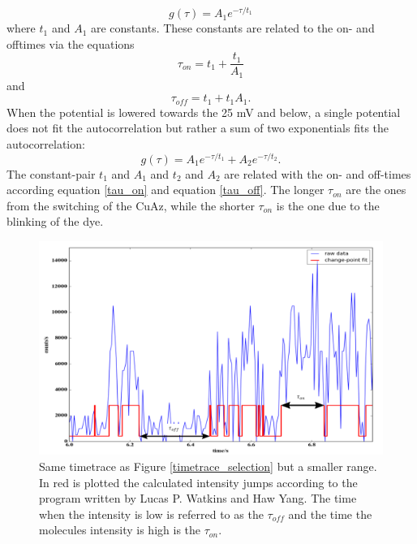\documentclass[twoside,single]{lion-msc}
\begin{document}
\begin{equation} \label{single_exp}
g(\tau) =  A_{1}e^{-\tau/t_{1}}
\end{equation}
where $t_{1}$ and $A_{1}$ are constants. These constants are related to the on- and offtimes via the equations
\begin{equation}\label{tau_on}
\tau_{on} = t_{1} +\frac{t_{1}}{A_{1}}
\end{equation}
and
\begin{equation}\label{tau_off}
\tau_{off} = t_{1} +t_{1}A_{1}.
\end{equation}
When the potential is lowered towards the 25 mV and below, a single potential does not fit the autocorrelation but rather a sum of two exponentials fits the autocorrelation: 
\begin{equation}\label{multi_exp}
g(\tau) = A_{1}e^{-\tau/t_{1}} + A_{2}e^{-\tau/t_{2}}. 
\end{equation}
The constant-pair $t_{1}$ and $A_{1}$ and $t_{2}$ and $A_{2}$ are related with the on- and off-times according equation \ref{tau_on} and equation \ref{tau_off}. The longer $\tau_{on}$ are the ones from the switching of the CuAz, while the shorter $\tau_{on}$ is the one due to the blinking of the dye.


\begin{figure}[ht!]
\centering
\includegraphics[width=\textwidth]{on_off_test1}
\caption{Same timetrace as Figure \ref{timetrace_selection} but a smaller range. In red is plotted the calculated intensity jumps according to the program written by Lucas P. Watkins and Haw Yang. The time when the intensity is low is referred to as the $\tau_{off}$ and the time the molecules intensity is high is the $\tau_{on}$.}
\label{on_off_times}
\end{figure}
\end{document}
